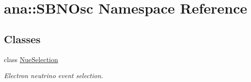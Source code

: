 \hypertarget{namespaceana_1_1SBNOsc}{
\section{ana::SBNOsc Namespace Reference}
\label{namespaceana_1_1SBNOsc}
}
\subsection*{Classes}
\begin{DoxyCompactItemize}
\item 
class \hyperlink{classana_1_1SBNOsc_1_1NueSelection}{NueSelection}
\begin{DoxyCompactList}\small\item\em Electron neutrino event selection. \item\end{DoxyCompactList}\end{DoxyCompactItemize}
